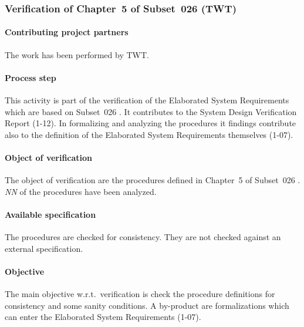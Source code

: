 \subsubsection{Verification of Chapter~5 of Subset~026 (TWT)}
\label{sec:verif-Subset-026}

\paragraph{Contributing project partners}
The work has been performed by TWT.

\paragraph{Process step}

This activity is part of the verification of the Elaborated System
Requirements which are based on Subset~026 \cite{subset-026:3.3.0}. It
contributes to the System Design Verification Report (1-12). In
formalizing and analyzing the procedures it findings contribute also
to the definition of the Elaborated System Requirements themselves
(1-07).

\paragraph{Object of verification}

The object of verification are the procedures defined in Chapter~5 of
Subset~026 \cite[5]{subset-026:3.3.0}. \textit{NN} of the 
procedures have been analyzed. 

\paragraph{Available specification}
The procedures are checked for consistency. They are not checked
against an external specification.

\paragraph{Objective}
The main objective w.r.t.\ verification is check the procedure definitions for
consistency and some sanity conditions. A by-product are
formalizations which can enter the Elaborated System Requirements (1-07). 


